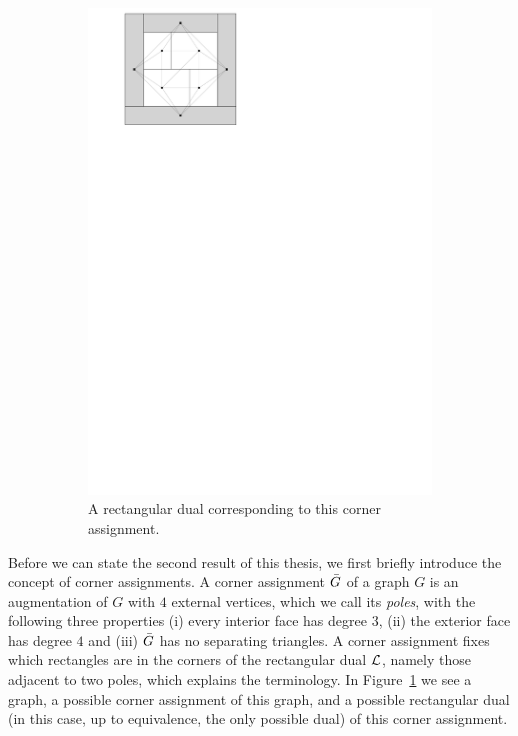 \begin{figure}
\begin{subfigure}[t]{3cm}
        \includegraphics[scale=.3]{introduction/img/caDual.pdf}
        \caption{A rectangular dual corresponding to this corner assignment.}
      \end{subfigure}
    \caption{}
    \label{fig:intro:cornerAssign}
  \end{figure}

  Before we can state the second result of this thesis, we first briefly introduce the concept of corner assignments.
  A corner assignment $\bar{G}$ of a graph $G$ is an augmentation of $G$ with $4$ external vertices, which we call its \emph{poles}, with the following three properties (i) every interior face has degree $3$, (ii) the exterior face has degree $4$ and (iii) $\bar{G}$ has no separating triangles.
  A corner assignment fixes which rectangles are in the corners of the rectangular dual $\mathcal{L}$, namely those adjacent to two poles, which explains the terminology. In Figure~\ref{fig:intro:cornerAssign} we see a graph, a possible corner assignment of this graph, and a possible rectangular dual (in this case, up to equivalence, the only possible dual) of this corner assignment.

